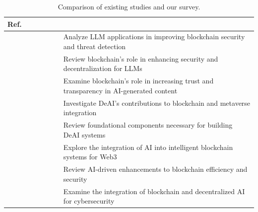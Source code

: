 \documentclass[5p,twocolumn]{elsarticle}
\begin{document}
\begin{table}[!t]
\centering
\caption{Comparison of existing studies and our survey.}
\label{tab:related}
\footnotesize
\begin{tabularx}{\linewidth}{>{\hsize}Z>{\hsize}Z>{\hsize}Z>{\hsize}Z>{\hsize}Z>{\hsize}Z>{\hsize}X} 
\toprule

\textbf{Ref.} &  &  &  &  &  &  \\\toprule 

\cite{he2024large} &  &  &  &  &  & Analyze LLM applications in improving blockchain security and threat detection \\

\cite{geren2025blockchain} &  &  &  &  &  & Review blockchain's role in enhancing security and decentralization for LLMs \\

\cite{luo2024bc4llm} &  &  &  &  &  & Examine blockchain's role in increasing trust and transparency in \newline AI-generated content \\\midrule

\cite{cao2022decentralized} &  &  &  &  &  & Investigate DeAI's contributions to blockchain and metaverse \newline integration \\

\cite{kersic2024review} &  &  &  &  &  & Review foundational components necessary for building DeAI systems \\

\cite{li2024blockchain} &  &  &  &  &  & Explore the integration of AI into intelligent blockchain systems for Web3 \\

\cite{ressi2024ai} &  &  &  &  &  & Review AI-driven enhancements to blockchain efficiency and security \\

\cite{saleh2024blockchain} &  &  &  &  &  & Examine the integration of blockchain and decentralized AI for \newline cybersecurity \\


\end{tabularx}
\end{table}
\end{document}
